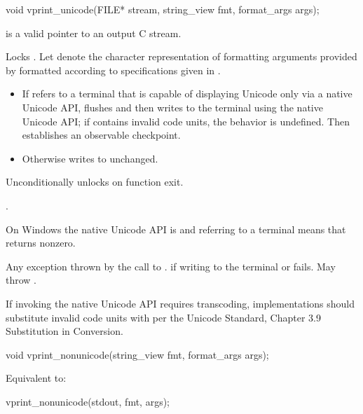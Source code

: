%
\begin{itemdecl}
void vprint_unicode(FILE* stream, string_view fmt, format_args args);
\end{itemdecl}

\begin{itemdescr}
\pnum
\expects
{} is a valid pointer to an output C stream.

\pnum
\effects
Locks .
Let  denote the character representation of
formatting arguments provided by 
formatted according to specifications given in .
\begin{itemize}
\item
If  refers to a terminal that
is capable of displaying Unicode only via a native Unicode API,
flushes  and then
writes  to the terminal using the native Unicode API;
if  contains invalid code units,
%
the behavior is undefined.
Then establishes an observable checkpoint.
\item
Otherwise writes  to  unchanged.
\end{itemize}
Unconditionally unlocks  on function exit.

.

\begin{note}
On Windows the native Unicode API is  and
 referring to a terminal means that
returns nonzero.
\end{note}

\pnum
\throws
Any exception thrown by the call to .
 if writing to the terminal or  fails.
May throw .

\pnum
\recommended
If invoking the native Unicode API requires transcoding,
implementations should substitute invalid code units
with  per
the Unicode Standard, Chapter 3.9  Substitution in Conversion.
\end{itemdescr}

%
\begin{itemdecl}
void vprint_nonunicode(string_view fmt, format_args args);
\end{itemdecl}

\begin{itemdescr}
\pnum
\effects
Equivalent to:
\begin{codeblock}
vprint_nonunicode(stdout, fmt, args);
\end{codeblock}
\end{itemdescr}

